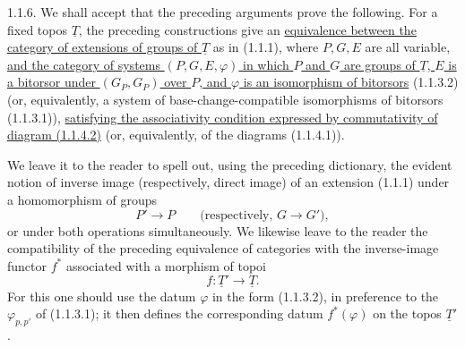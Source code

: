 
1.1.6. We shall accept that the preceding arguments prove the following.
For a fixed topos $\underline T$, the preceding constructions give an
\underline{equivalence between the category of extensions of groups of
$\underline T$} as in (1.1.1), where $P,G,E$ are all variable,
\underline{and the category of systems $(P,G,E,\varphi)$ in which $P$
and $G$ are groups of $\underline T$, $E$ is a bitorsor under
$(G_P,G_P)$ over $P$, and $\varphi$ is an isomorphism of bitorsors}
(1.1.3.2) (or, equivalently, a system of base-change-compatible
isomorphisms of bitorsors (1.1.3.1)), \underline{satisfying the
associativity condition expressed by commutativity of diagram (1.1.4.2)}
(or, equivalently, of the diagrams (1.1.4.1)).

We leave it to the reader to spell out, using the preceding dictionary,
the evident notion of inverse image (respectively, direct image) of an
extension (1.1.1) under a homomorphism of groups
\[
 P'\longrightarrow P
 \qquad\bigl(\text{respectively, }G\longrightarrow G'\bigr),
\]
or under both operations simultaneously. We likewise leave to the reader
the compatibility of the preceding equivalence of categories with the
inverse-image functor $f^*$ associated with a morphism of topoi
\[
 f:\underline T'\longrightarrow\underline T.
\]
For this one should use the datum $\varphi$ in the form (1.1.3.2), in
preference to the $\varphi_{p,p'}$ of (1.1.3.1); it then defines the
corresponding datum $f^*(\varphi)$ on the topos $\underline T'$.


